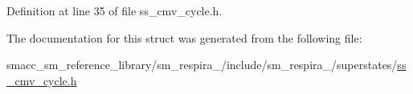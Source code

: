 Definition at line 35 of file ss\+\_\+cmv\+\_\+cycle.\+h.



The documentation for this struct was generated from the following file\+:\begin{DoxyCompactItemize}
\item 
smacc\+\_\+sm\+\_\+reference\+\_\+library/sm\+\_\+respira\+\_/include/sm\+\_\+respira\+\_/superstates/\hyperlink{ss__cmv__cycle_8h}{ss\+\_\+cmv\+\_\+cycle.\+h}\end{DoxyCompactItemize}
